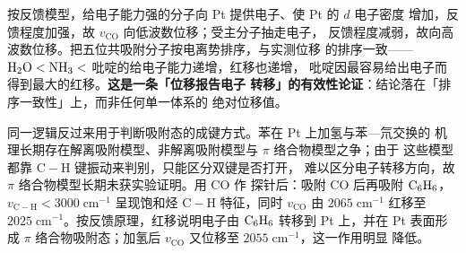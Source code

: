\begin{infer}
按反馈模型，给电子能力强的分子向 Pt 提供电子、使 Pt 的 $d$ 电子密度
增加，反馈程度加强，故 $v_{\mathrm{CO}}$ 向低波数位移；受主分子抽走电子，
反馈程度减弱，故向高波数位移。把五位共吸附分子按电离势排序，与实测位移
的排序一致——$\ce{H2O}<\ce{NH3}<$ 吡啶的给电子能力递增，红移也递增，
吡啶因最容易给出电子而得到最大的红移。\textbf{这是一条「位移报告电子
转移」的有效性论证}：结论落在「排序一致性」上，而非任何单一体系的
绝对位移值。

同一逻辑反过来用于判断吸附态的成键方式。苯在 Pt 上加氢与苯—氘交换的
机理长期存在解离吸附模型、非解离吸附模型与 $\pi$ 络合物模型之争；由于
这些模型都靠 $\mathrm{C{-}H}$ 键振动来判别，只能区分双键是否打开，
难以区分电子转移方向，故 $\pi$ 络合物模型长期未获实验证明。用 CO 作
探针后：吸附 CO 后再吸附 $\ce{C6H6}$，$v_{\mathrm{C{-}H}}<3000\;\mathrm{cm^{-1}}$
呈现饱和烃 $\mathrm{C{-}H}$ 特征，同时 $v_{\mathrm{CO}}$ 由
$2065\;\mathrm{cm^{-1}}$ 红移至 $2025\;\mathrm{cm^{-1}}$。按反馈原理，红移说明电子由 $\ce{C6H6}$
转移到 Pt 上，并在 Pt 表面形成 $\pi$ 络合物吸附态；加氢后 $v_{\mathrm{CO}}$ 又位移至 $2055\;\mathrm{cm^{-1}}$，这一作用明显
降低。
\end{infer}

